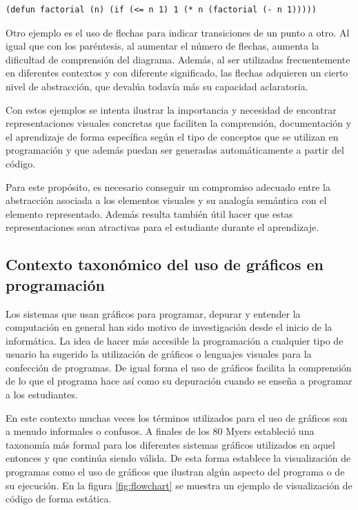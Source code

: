 \documentclass{llncs}
\begin{document}
\begin{verbatim}
(defun factorial (n) (if (<= n 1) 1 (* n (factorial (- n 1)))))
\end{verbatim}

Otro ejemplo es el uso de flechas para indicar transiciones de un punto a otro. Al igual que con los paréntesis, al aumentar el número de flechas, aumenta la dificultad de comprensión del diagrama. Además, al ser utilizadas frecuentemente en diferentes contextos y con diferente significado, las flechas adquieren un cierto nivel de abstracción, que devalúa todavía más su capacidad aclaratoria. 

Con estos ejemplos se intenta ilustrar la importancia y necesidad de encontrar representaciones visuales concretas que faciliten la comprensión, documentación y el aprendizaje de forma específica según el tipo de conceptos que se utilizan en programación y que además puedan ser generadas automáticamente a partir del código. 

Para este propósito, es necesario conseguir un compromiso adecuado entre la abstracción asociada a los elementos visuales y su analogía semántica con el elemento representado. Además resulta también útil hacer que estas representaciones sean atractivas para el estudiante durante el aprendizaje. 
\subsection{Contexto taxonómico del uso de gráficos en programación}
\label{subsec:taxonomy}
Los sistemas que usan gráficos para programar, depurar y entender la computación en general han sido motivo de investigación desde el inicio de la informática. La idea de hacer más accesible la programación a cualquier tipo de usuario ha sugerido la utilización de gráficos o lenguajes visuales para la confección de programas. De igual forma el uso de gráficos facilita la comprensión de lo que el programa hace así como su depuración cuando se enseña a programar a los estudiantes. 

En este contexto muchas veces los términos utilizados para el uso de gráficos son a menudo informales o confusos. A finales de los 80 Myers \cite{myers1990taxonomies} estableció una taxonomía más formal para los diferentes sistemas gráficos utilizados en aquel entonces y que continúa siendo válida. De esta forma establece la visualización de programas como el uso de gráficos que ilustran algún aspecto del programa o de su ejecución. En la figura \ref{fig:flowchart} se muestra un ejemplo de visualización de código de forma estática. 
\end{document}
